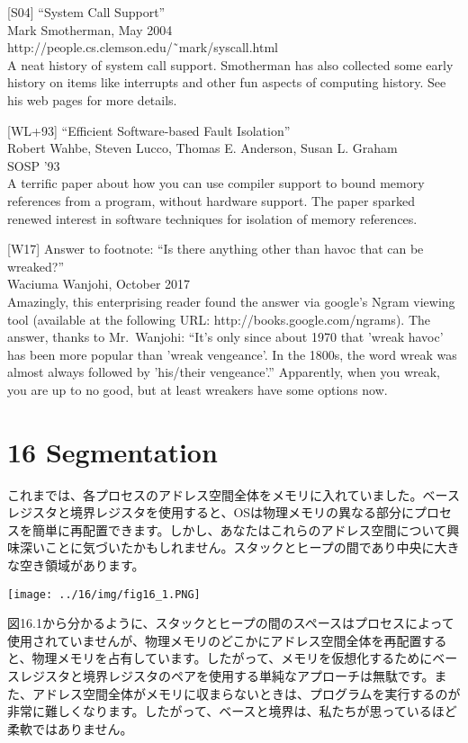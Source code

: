 {[}S04{]} ``System Call Support''\\
Mark Smotherman, May 2004\\
http://people.cs.clemson.edu/˜mark/syscall.html\\
A neat history of system call support. Smotherman has also collected
some early history on items like interrupts and other fun aspects of
computing history. See his web pages for more details.

{[}WL+93{]} ``Efficient Software-based Fault Isolation''\\
Robert Wahbe, Steven Lucco, Thomas E. Anderson, Susan L. Graham\\
SOSP '93\\
A terrific paper about how you can use compiler support to bound memory
references from a program, without hardware support. The paper sparked
renewed interest in software techniques for isolation of memory
references.

{[}W17{]} Answer to footnote: ``Is there anything other than havoc that
can be wreaked?''\\
Waciuma Wanjohi, October 2017\\
Amazingly, this enterprising reader found the answer via google's Ngram
viewing tool (available at the following URL:
http://books.google.com/ngrams). The answer, thanks to Mr.~Wanjohi:
``It's only since about 1970 that 'wreak havoc' has been more popular
than 'wreak vengeance'. In the 1800s, the word wreak was almost always
followed by 'his/their vengeance'.'' Apparently, when you wreak, you are
up to no good, but at least wreakers have some options now.

\newpage

\hypertarget{segmentation}{%
\section*{16 Segmentation}\label{segmentation}}

これまでは、各プロセスのアドレス空間全体をメモリに入れていました。ベースレジスタと境界レジスタを使用すると、OSは物理メモリの異なる部分にプロセスを簡単に再配置できます。しかし、あなたはこれらのアドレス空間について興味深いことに気づいたかもしれません。スタックとヒープの間であり中央に大きな空き領域があります。

\texttt{[image: ../16/img/fig16\_1.PNG]}

図16.1から分かるように、スタックとヒープの間のスペースはプロセスによって使用されていませんが、物理メモリのどこかにアドレス空間全体を再配置すると、物理メモリを占有しています。したがって、メモリを仮想化するためにベースレジスタと境界レジスタのペアを使用する単純なアプローチは無駄です。また、アドレス空間全体がメモリに収まらないときは、プログラムを実行するのが非常に難しくなります。したがって、ベースと境界は、私たちが思っているほど柔軟ではありません。

